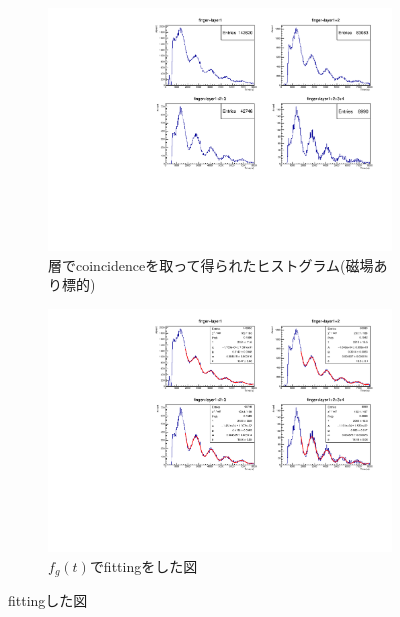 \begin{figure}[H]
\centering
\begin{subfigure}{\columnwidth}
\centering
\includegraphics[height = 0.9\columnwidth , angle = -90]{figure/ikemitsu/g_layer_f_coin.pdf}
\caption{層でcoincidenceを取って得られたヒストグラム(磁場あり標的)}
\label{g_layercoin}
\end{subfigure}
\begin{subfigure}{\columnwidth}
\centering
\includegraphics[height = 0.9\columnwidth , angle = -90]{figure/ikemitsu/g_laye_f_coin_fit.pdf}
\caption{$f_{g}(t)$でfittingをした図}
\label{g_layercoin_fit}
\end{subfigure}
\caption{fittingした図}
\label{g_layercoin_all}
\end{figure}

